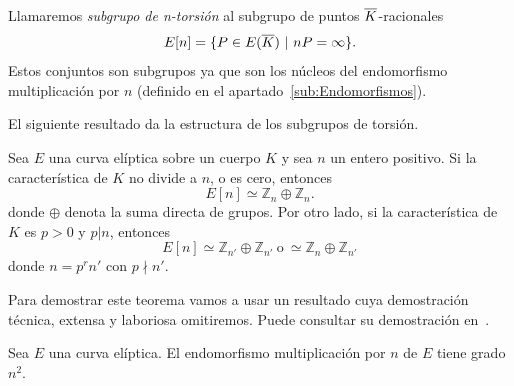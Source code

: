 \begin{definicion}
	Llamaremos \emph{subgrupo de n-torsión} al subgrupo de puntos $\overline{K}$-racionales
	$$
		E[n] = \{ P \in E(\overline{K}) \ | \  n P = \infty \}.
	$$
	Estos conjuntos son subgrupos ya que son los núcleos del endomorfismo multiplicación por $n$ (definido en el apartado~\ref{sub:Endomorfismos}).
\end{definicion}

El siguiente resultado da la estructura de los subgrupos de torsión.

\begin{teorema}\label{th:estructura subgrupos torsión}
	Sea $E$ una curva elíptica sobre un cuerpo $K$ y sea $n$ un entero positivo. Si la característica de $K$ no divide a $n$, o es cero, entonces
	$$
		E[n] \simeq \mathbb{Z}_n \oplus \mathbb{Z}_n.
	$$
	donde $\oplus$ denota la suma directa de grupos. Por otro lado, si la característica de $K$ es $p > 0$ y $p | n$, entonces
	$$
		E[n] \simeq \mathbb{Z}_{n'} \oplus \mathbb{Z}_{n'} \ \textrm{o} \ \simeq \mathbb{Z}_{n} \oplus \mathbb{Z}_{n'}
	$$
	donde $n = p^r n'$ con $p \nmid n'$.
\end{teorema}

Para demostrar este teorema vamos a usar un resultado cuya demostración técnica, extensa y laboriosa omitiremos. Puede consultar su demostración en~\cite[sec. 3.2]{Washington:2008}.

\begin{proposicion}\label{pp:grado endomorfismo multiplicación}
	Sea $E$ una curva elíptica. El endomorfismo multiplicación por $n$ de $E$ tiene grado $n^2$.
\end{proposicion}

